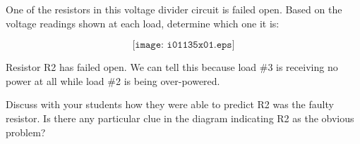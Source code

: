

One of the resistors in this voltage divider circuit is failed open.  Based on the voltage readings shown at each load, determine which one it is:

$$\texttt{[image: i01135x01.eps]}$$







Resistor R2 has failed open.  We can tell this because load \#3 is receiving no power at all while load \#2 is being over-powered.







Discuss with your students how they were able to predict R2 was the faulty resistor.  Is there any particular clue in the diagram indicating R2 as the obvious problem?




